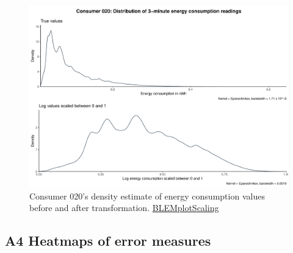 \begin{centering}
\begin{figure}[!htbp]
        \includegraphics[width=\textwidth-0.85cm]{thesis/graphs/c020_density.pdf}
        \caption[Energy consumption distribution before and after transformation]{Consumer 020's density estimate of energy consumption values before and after transformation. \quantnet\href{ }{BLEMplotScaling}}
\end{figure}
\end{centering}

\newpage
\subsection*{\hypertarget{AppA4:Figures:heatmaps}{A4} Heatmaps of error measures}\label{AppA4:Figures:heatmaps}

